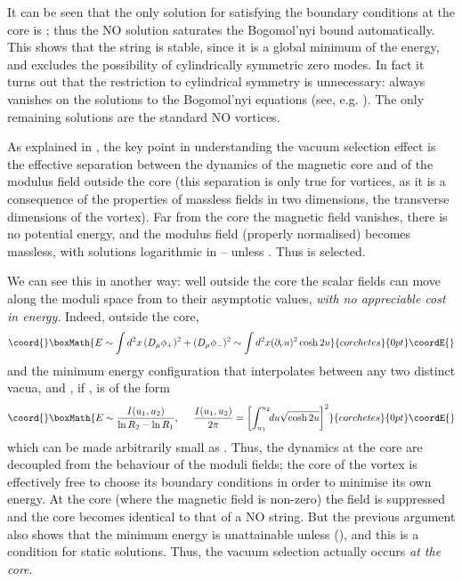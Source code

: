 \documentclass[a4paper,aps,prd,superscriptaddress,floats]{revtex4}
\begin{document}
It can be seen that the only solution for \coordHE{} satisfying the boundary
conditions at the core is \coordHE{}; thus the NO solution saturates
the Bogomol'nyi bound automatically. This shows that the string is
stable, since it is a  global minimum of the energy, and excludes the
possibility of cylindrically symmetric zero modes. In fact it turns
out that the restriction  to cylindrical symmetry is unnecessary:
\myHighlight{$\phi_-$}\coordHE{} always vanishes on the solutions to the Bogomol'nyi equations
(see, e.g. \cite{W.}).  The only remaining solutions are the standard
NO vortices.

As explained in \cite{PRTT96}, the key point in understanding the
 vacuum selection effect is the effective separation between the
 dynamics of the magnetic core and of the modulus field outside the
 core (this separation is only true for vortices, as it is a
 consequence of the properties of massless fields in two dimensions,
 the transverse dimensions of the vortex).  Far from the core the
 magnetic field vanishes, there is no potential energy, and the
 modulus field (properly normalised) becomes massless, with solutions
 logarithmic in \coordHE{} -- unless \coordHE{}.  Thus \coordHE{} is selected.

We can see this in another way:
well outside the core the scalar fields can move along 
the moduli space from \coordHE{} to their asymptotic values, {\it with no 
appreciable cost in energy}. Indeed, outside the core,
\[\coord{}\boxMath{
E \sim \int d^2x\, (D_\mu \phi_+)^2 + (D_\mu \phi_-)^2 \sim
\int d^2x (\partial_r u)^2 \cosh 2u 
}{corchetes}{0pt}\coordE{}\]
and the minimum energy configuration \coordHE{} that interpolates between
any two distinct vacua, \coordHE{} and \coordHE{}, if \coordHE{}, is of the form
\[\coord{}\boxMath{
 E \sim {I(u_1, u_2) \over {\ln R_2 - \ln R_1}},
\hspace{0.5cm}
{I (u_1, u_2)\over{2\pi}} =\left[
 \int_{u_1}^{u_2}\!\! du\sqrt{\cosh 2u}\right]^2
}{corchetes}{0pt}\coordE{}\]
which can be made arbitrarily small as \coordHE{}.  Thus, the
dynamics at the core are decoupled from the behaviour of the moduli
fields; the core of the vortex is effectively free to choose its
boundary conditions in order to minimise its own energy.  At the core
(where the magnetic field is non-zero) the field \myHighlight{$\phi_-$}\coordHE{} is
suppressed and the core becomes identical to that of a NO string.  But
the previous argument also shows that the minimum energy is
unattainable unless \coordHE{} (\coordHE{}), and this is a condition for
static solutions.  Thus, the vacuum selection actually occurs {\it at
the core}.  
\end{document}
